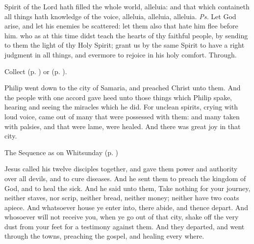 
\introit
{} Spirit of the Lord hath filled the whole world, alleluia: and that which containeth all things hath knowledge of the voice, alleluia, alleluia, alleluia. \textit{Ps.} Let God arise, and let his enemies be scattered: let them also that hate him flee before him.
\collect
{} who as at this time didst teach the hearts of thy faithful people, by sending to them the light of thy Holy Spirit; grant us by the same Spirit to have a right judgment in all things, and evermore to rejoice in his holy comfort. Through.
\begin{rubric}
     Collect  (p. \pageref{SPAgainst}) or  (p. \pageref{SPChiefBishop}).
\end{rubric}
 Philip went down to the city of Samaria, and preached Christ unto them. And the people with one accord gave heed unto those things which Philip spake, hearing and seeing the miracles which he did. For unclean spirits, crying with loud voice, came out of many that were possessed with them: and many taken with palsies, and that were lame, were healed. And there was great joy in that city.

\begin{rubric}
{The Sequence as on Whitsunday (p. \pageref{WhitSeq})}
\end{rubric}

 Jesus called his twelve disciples together, and gave them power and authority over all devils, and to cure diseases. And he sent them to preach the kingdom of God, and to heal the sick. And he said unto them, Take nothing for your journey, neither staves, nor scrip, neither bread, neither money; neither have two coats apiece. And whatsoever house ye enter into, there abide, and thence depart. And whosoever will not receive you, when ye go out of that city, shake off the very dust from your feet for a testimony against them. And they departed, and went through the towns, preaching the gospel, and healing every where.


